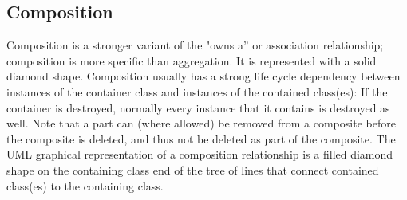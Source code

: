 \documentclass[10pt]{article}
\begin{document}
\subsection{Composition}
Composition is a stronger variant of the "owns a” or association
relationship; composition is more specific than aggregation. It is represented with a solid diamond shape. 
\vskip10pt%
\noindent
Composition usually has a strong life cycle dependency between
instances of the container class and instances of the contained class(es): If the container is destroyed, normally every instance that it contains is destroyed as well. Note that a part can (where allowed) be removed from a composite before the composite is deleted, and thus
not be deleted as part of the composite.
\vskip10pt%
\noindent
The UML graphical representation of a composition relationship is a filled diamond shape on the containing class
end of the tree of lines that connect contained class(es) to the containing class.
\vskip10pt%
\





%

 
\end{document}

